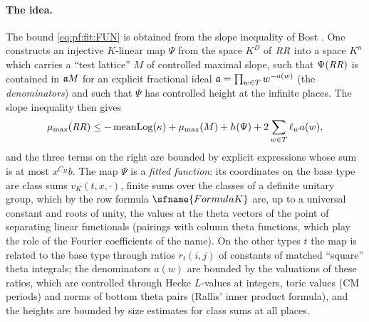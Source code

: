 \paragraph{The idea.}
The bound \eqref{eq:pf:fit:FUN} is obtained from the slope inequality of Bost \cite{Bost1996,Bost2001}. One
constructs an injective $K$-linear map $\Psi$ from the space $K^D$ of $\mathit{RR}$ into a space $K^n$ which carries a
``test lattice'' $M$ of controlled maximal slope, such that $\Psi(\mathit{RR})$ is contained in $\mathfrak{a} M$ for an
explicit fractional ideal $\mathfrak{a}=\prod_{w\in T}w^{-a(w)}$ (the \emph{denominators}) and such that $\Psi$ has
controlled height at the infinite places. The slope inequality then gives
\[
\mu_{\max}(\mathit{RR})\le-\operatorname{meanLog}(\kappa)+\mu_{\max}(M)+h(\Psi)+2\sum_{w\in T}\ell_wa(w),
\]
and the three terms on the right are bounded by explicit expressions whose sum is at most $x^{C_H}b$. The map $\Psi$
is a \emph{fitted function}: its coordinates on the base type are class sums $v_K(t,x,\cdot)$, finite sums over the
classes of a definite unitary group, which by the row formula $\sfname{FormulaK}$ are, up to a universal constant
and roots of unity, the values at the theta vectors of the point of separating linear functionals (pairings with
column theta functions, which play the role of the Fourier coefficients of the name). On the other types $t$ the map is related to the base type through
ratios $r_t(i,j)$ of constants of matched ``square'' theta integrals; the denominators $a(w)$ are bounded by the
valuations of these ratios, which are controlled through Hecke $L$-values at integers, toric values (CM periods) and
norms of bottom theta pairs (Rallis' inner product formula), and the heights are bounded by size estimates for class
sums at all places.

